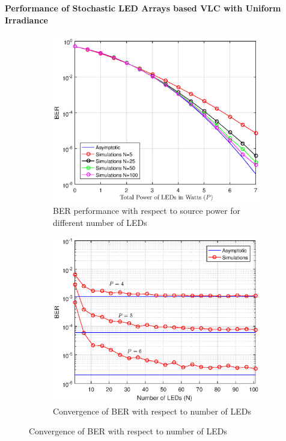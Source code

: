 \documentclass{beamer}
\theoremstyle{remark}
\begin{document}
\begin{frame}
\frametitle{\,}
\framesubtitle{Performance of Stochastic LED Arrays based VLC with Uniform Irradiance}
\begin{figure}
 \begin{subfigure}[t]{0.49\framewidth}
      \centering
      \includegraphics[width=\columnwidth]{berCurveVariousN}
      \caption{ BER performance with respect to source power for different number of LEDs}
            \label{fig:PeVSSnr}
 \end{subfigure} 
 \begin{subfigure}[t]{0.49\framewidth}
      \centering
      \includegraphics[width=\columnwidth]{berCurveVSN}
      \caption{Convergence of BER with respect to number of LEDs}
         \label{fig:PeConvergence}
 \end{subfigure} 
\end{figure}
\end{frame}
\end{document}
